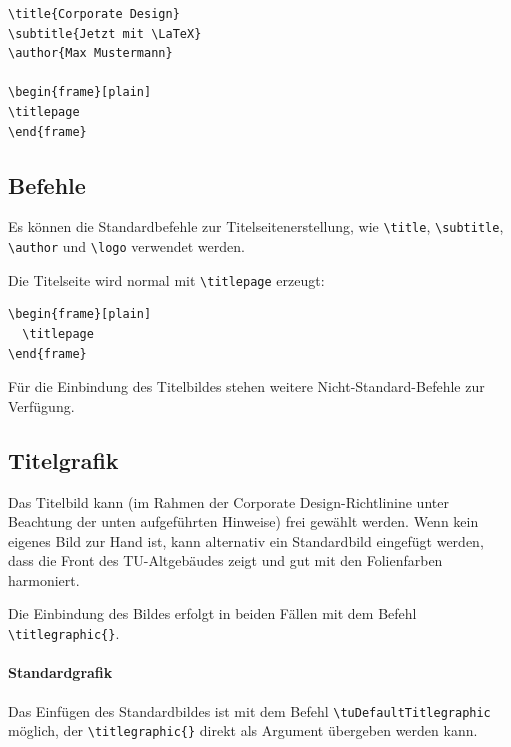 \documentclass[cmyk,a4paper,colorscheme=green,TUBStitlepage=picture]{tubsreprt}
\begin{document}
\begin{minipage}{0.5\textwidth}
\begin{verbatim}
\title{Corporate Design}
\subtitle{Jetzt mit \LaTeX}
\author{Max Mustermann}

\begin{frame}[plain]
\titlepage
\end{frame}
\end{verbatim}
\end{minipage}
\begin{minipage}{0.5\textwidth}
\end{minipage}

\subsection{Befehle}

Es können die Standardbefehle zur Titelseitenerstellung, wie
\lstinline{\title},
\lstinline{\subtitle},
\lstinline{\author}
und \lstinline{\logo} verwendet werden.

Die Titelseite wird normal mit \lstinline{\titlepage} erzeugt:

\begin{lstlisting}
\begin{frame}[plain]
  \titlepage
\end{frame}
\end{lstlisting}

Für die Einbindung des Titelbildes stehen weitere Nicht-Standard-Befehle zur
Verfügung.


\subsection{Titelgrafik}

Das Titelbild kann (im Rahmen der Corporate Design-Richtlinine
unter Beachtung der unten aufgeführten Hinweise) frei gewählt werden.
Wenn kein eigenes Bild zur Hand ist, kann alternativ ein Standardbild eingefügt
werden, dass die Front des TU-Altgebäudes zeigt und gut mit den Folienfarben
harmoniert.

Die Einbindung des Bildes erfolgt in beiden Fällen mit dem Befehl
\lstinline!\titlegraphic{}!.

\paragraph{Standardgrafik}

Das Einfügen des Standardbildes ist mit dem Befehl
\linebreak\lstinline{\tuDefaultTitlegraphic} möglich,
der \lstinline!\titlegraphic{}! direkt als Argument übergeben werden kann.
\end{document}
